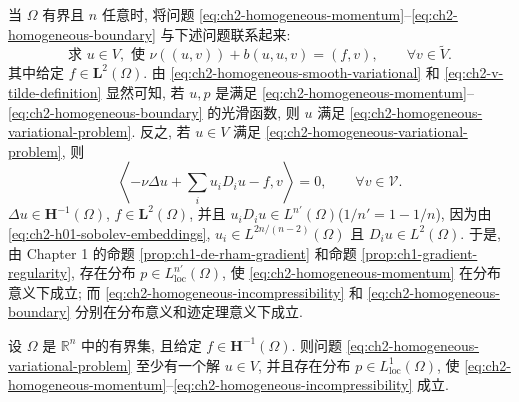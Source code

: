 当 $\Omega$ 有界且 $n$ 任意时, 将问题 \eqref{eq:ch2-homogeneous-momentum}--\eqref{eq:ch2-homogeneous-boundary} 与下述问题联系起来:
\begin{equation}
\text{求 }u\in V,\text{ 使 }
\nu((u,v))+b(u,u,v)=(f,v),
\qquad\forall v\in\widetilde V.
\label{eq:ch2-homogeneous-variational-problem}
\end{equation}
其中给定 $f\in\mathbf L^2(\Omega)$. 由 \eqref{eq:ch2-homogeneous-smooth-variational} 和 \eqref{eq:ch2-v-tilde-definition} 显然可知, 若 $u,p$ 是满足 \eqref{eq:ch2-homogeneous-momentum}--\eqref{eq:ch2-homogeneous-boundary} 的光滑函数, 则 $u$ 满足 \eqref{eq:ch2-homogeneous-variational-problem}. 反之, 若 $u\in V$ 满足 \eqref{eq:ch2-homogeneous-variational-problem}, 则
\begin{equation}
\left\langle-\nu\Delta u+\sum_i u_iD_iu-f,v\right\rangle=0,
\qquad\forall v\in\mathcal V.
\label{eq:ch2-homogeneous-distribution-orthogonality}
\end{equation}
$\Delta u\in\mathbf H^{-1}(\Omega)$, $f\in\mathbf L^2(\Omega)$, 并且 $u_iD_iu\in L^{n'}(\Omega)$($1/n'=1-1/n$), 因为由 \eqref{eq:ch2-h01-sobolev-embeddings}, $u_i\in L^{2n/(n-2)}(\Omega)$ 且 $D_iu\in L^2(\Omega)$. 于是, 由 Chapter 1 的命题 \ref{prop:ch1-de-rham-gradient} 和命题 \ref{prop:ch1-gradient-regularity}, 存在分布 $p\in L_{\mathrm{loc}}^{n'}(\Omega)$, 使 \eqref{eq:ch2-homogeneous-momentum} 在分布意义下成立; 而 \eqref{eq:ch2-homogeneous-incompressibility} 和 \eqref{eq:ch2-homogeneous-boundary} 分别在分布意义和迹定理意义下成立.

\hypertarget{chapter-02-page-125}{}
\begin{Theorem}
\label{thm:ch2-homogeneous-existence}
设 $\Omega$ 是 $\mathbb R^n$ 中的有界集, 且给定 $f\in\mathbf H^{-1}(\Omega)$. 则问题 \eqref{eq:ch2-homogeneous-variational-problem} 至少有一个解 $u\in V$, 并且存在分布 $p\in L_{\mathrm{loc}}^1(\Omega)$, 使 \eqref{eq:ch2-homogeneous-momentum}--\eqref{eq:ch2-homogeneous-incompressibility} 成立.
\end{Theorem}

